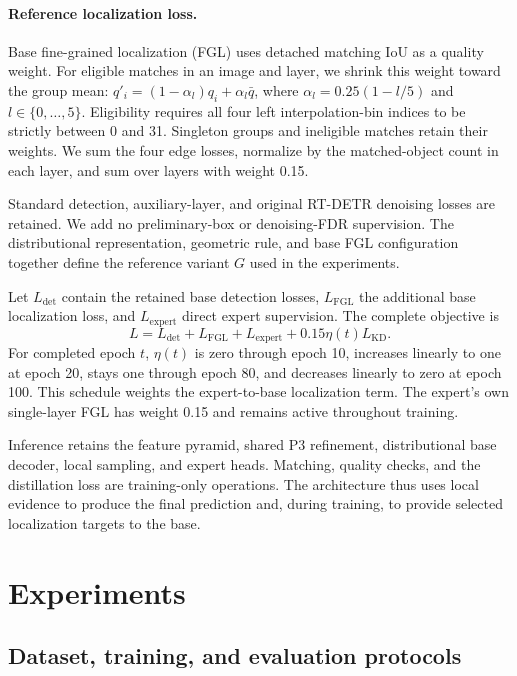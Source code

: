 \paragraph{Reference localization loss.}
Base fine-grained localization (FGL) uses detached matching IoU as a quality weight. For eligible matches in an image and layer, we shrink this weight toward the group mean: $q'_i=(1-\alpha_l)q_i+\alpha_l\bar q$, where $\alpha_l=0.25(1-l/5)$ and $l\in\{0,\ldots,5\}$. Eligibility requires all four left interpolation-bin indices to be strictly between 0 and 31. Singleton groups and ineligible matches retain their weights. We sum the four edge losses, normalize by the matched-object count in each layer, and sum over layers with weight 0.15.

Standard detection, auxiliary-layer, and original RT-DETR denoising losses are retained. We add no preliminary-box or denoising-FDR supervision. The distributional representation, geometric rule, and base FGL configuration together define the reference variant $G$ used in the experiments.


Let $L_{\mathrm{det}}$ contain the retained base detection losses, $L_{\mathrm{FGL}}$ the additional base localization loss, and $L_{\mathrm{expert}}$ direct expert supervision. The complete objective is
\begin{equation}
L=L_{\mathrm{det}}+L_{\mathrm{FGL}}+L_{\mathrm{expert}}
+0.15\eta(t)L_{\mathrm{KD}}.
\label{eq:objective}
\end{equation}
For completed epoch $t$, $\eta(t)$ is zero through epoch 10, increases linearly to one at epoch 20, stays one through epoch 80, and decreases linearly to zero at epoch 100. This schedule weights the expert-to-base localization term. The expert's own single-layer FGL has weight 0.15 and remains active throughout training.

Inference retains the feature pyramid, shared P3 refinement, distributional base decoder, local sampling, and expert heads. Matching, quality checks, and the distillation loss are training-only operations. The architecture thus uses local evidence to produce the final prediction and, during training, to provide selected localization targets to the base.

\section{Experiments}
\subsection{Dataset, training, and evaluation protocols}
\label{sec:protocol}
